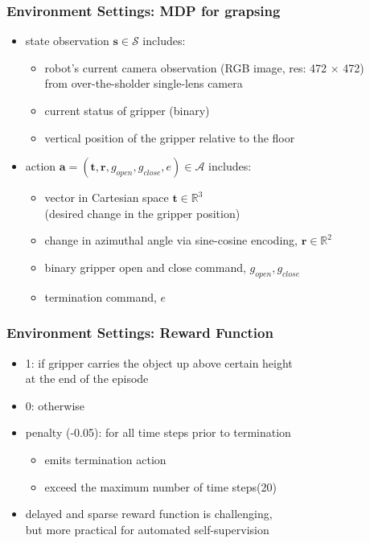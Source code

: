 \documentclass{beamer}
\renewcommand{\vec}[1]{\mathbf{#1}}
\newcommand{\fifthSec}{Environment Settings}
\begin{document}
    \begin{frame}
      \frametitle{\fifthSec : MDP for grapsing}
      \begin{itemize}
        \item state observation $\vec{s} \in \mathcal{S}$ includes:
        \begin{itemize}
          \item robot's current camera observation (RGB image, res: 472 $\times$ 472) \\
                from over-the-sholder single-lens camera
          \item current status of gripper (binary)
          \item vertical position of the gripper relative to the floor
        \end{itemize}
        \pause
        \item action $\vec{a} = (\vec{t}, \vec{r}, g_{open}, g_{close}, e) \in \mathcal{A}$ includes:
        \begin{itemize}
          \item vector in Cartesian space $\vec{t} \in \mathbb{R}^3$ \\ 
                (desired change in the gripper position)
          \item change in azimuthal angle via sine-cosine encoding, $\vec{r} \in \mathbb{R}^2$
          \item binary gripper open and close command, $g_{open}, g_{close}$
          \item termination command, $e$
        \end{itemize}
      \end{itemize}
    \end{frame}

    \begin{frame}
      \frametitle{\fifthSec : Reward Function}
      \begin{itemize}
        \item 1: if gripper carries the object up above certain height \\ 
              at the end of the episode
        \item 0: otherwise
        \pause
        \item penalty (-0.05): for all time steps prior to termination
        \begin{itemize}
          \item emits termination action
          \item exceed the maximum number of time steps(20)
          \linebreak
        \end{itemize}
        \pause
        \item delayed and sparse reward function is challenging, \\
              but more practical for automated self-supervision
      \end{itemize}
    \end{frame}
\end{document}
